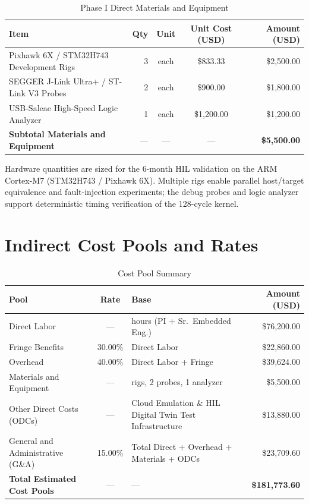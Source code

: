 \documentclass[10pt]{article}
\begin{document}
\begin{table}[H]
\centering
\small
\caption{Phase I Direct Materials and Equipment}
\label{tab:materials}
\begin{tabular}{@{}lrccr@{}}
\toprule
\textbf{Item} & \textbf{Qty} & \textbf{Unit} & \textbf{Unit Cost (USD)} & \textbf{Amount (USD)} \\
\midrule
Pixhawk 6X / STM32H743 Development Rigs & 3 & each & \$833.33 & \$2,500.00 \\
SEGGER J-Link Ultra+ / ST-Link V3 Probes & 2 & each & \$900.00 & \$1,800.00 \\
USB-Saleae High-Speed Logic Analyzer & 1 & each & \$1,200.00 & \$1,200.00 \\
\midrule
\textbf{Subtotal Materials and Equipment} & --- & --- & --- & \textbf{\$5,500.00} \\
\bottomrule
\end{tabular}
\end{table}

\smallskip
Hardware quantities are sized for the 6-month HIL validation on the ARM Cortex-M7 (STM32H743 / Pixhawk 6X). Multiple rigs enable parallel host/target equivalence and fault-injection experiments; the debug probes and logic analyzer support deterministic timing verification of the 128-cycle kernel.

\section{Indirect Cost Pools and Rates}

\begin{table}[H]
\centering
\small
\caption{Cost Pool Summary}
\label{tab:indirect-rates}
\begin{tabularx}{\textwidth}{@{}lc>{\raggedright\arraybackslash}Xr@{}}
\toprule
\textbf{Pool} & \textbf{Rate} & \textbf{Base} & \textbf{Amount (USD)} \\
\midrule
Direct Labor & --- & 840 hours (PI + Sr.~Embedded Eng.) & \$76,200.00 \\
Fringe Benefits & 30.00\% & Direct Labor & \$22,860.00 \\
Overhead & 40.00\% & Direct Labor + Fringe & \$39,624.00 \\
Materials and Equipment & --- & 3 rigs, 2 probes, 1 analyzer & \$5,500.00 \\
Other Direct Costs (ODCs) & --- & Cloud Emulation \& HIL Digital Twin Test Infrastructure & \$13,880.00 \\
General and Administrative (G\&A) & 15.00\% & Total Direct + Overhead + Materials + ODCs & \$23,709.60 \\
\midrule
\textbf{Total Estimated Cost Pools} & --- & --- & \textbf{\$181,773.60} \\
\bottomrule
\end{tabularx}
\end{table}
\end{document}

